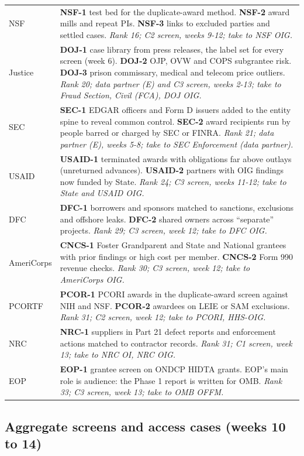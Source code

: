 \documentclass[letterpaper,11pt]{article}
\begin{document}
\begin{longtable}[l]{@{}l>{\raggedright\arraybackslash}p{}@{}}
NSF & \textbf{NSF-1} test bed for the duplicate-award method. \textbf{NSF-2} award mills and repeat PIs. \textbf{NSF-3} links to excluded parties and settled cases. \emph{Rank 16; C2 screen, weeks 9-12; take to NSF OIG.} \\
Justice & \textbf{DOJ-1} case library from press releases, the label set for every screen (week 6). \textbf{DOJ-2} OJP, OVW and COPS subgrantee risk. \textbf{DOJ-3} prison commissary, medical and telecom price outliers. \emph{Rank 20; data partner (E) and C3 screen, weeks 2-13; take to Fraud Section, Civil (FCA), DOJ OIG.} \\
SEC & \textbf{SEC-1} EDGAR officers and Form D issuers added to the entity spine to reveal common control. \textbf{SEC-2} award recipients run by people barred or charged by SEC or FINRA. \emph{Rank 21; data partner (E), weeks 5-8; take to SEC Enforcement (data partner).} \\
USAID & \textbf{USAID-1} terminated awards with obligations far above outlays (unreturned advances). \textbf{USAID-2} partners with OIG findings now funded by State. \emph{Rank 24; C3 screen, weeks 11-12; take to State and USAID OIG.} \\
DFC & \textbf{DFC-1} borrowers and sponsors matched to sanctions, exclusions and offshore leaks. \textbf{DFC-2} shared owners across ``separate'' projects. \emph{Rank 29; C3 screen, week 12; take to DFC OIG.} \\
AmeriCorps & \textbf{CNCS-1} Foster Grandparent and State and National grantees with prior findings or high cost per member. \textbf{CNCS-2} Form 990 revenue checks. \emph{Rank 30; C3 screen, week 12; take to AmeriCorps OIG.} \\
PCORTF & \textbf{PCOR-1} PCORI awards in the duplicate-award screen against NIH and NSF. \textbf{PCOR-2} awardees on LEIE or SAM exclusions. \emph{Rank 31; C2 screen, week 12; take to PCORI, HHS-OIG.} \\
NRC & \textbf{NRC-1} suppliers in Part 21 defect reports and enforcement actions matched to contractor records. \emph{Rank 31; C1 screen, week 13; take to NRC OI, NRC OIG.} \\
EOP & \textbf{EOP-1} grantee screen on ONDCP HIDTA grants. EOP's main role is audience: the Phase 1 report is written for OMB. \emph{Rank 33; C3 screen, week 13; take to OMB OFFM.} \\
\end{longtable}\endgroup

\hypertarget{aggregate-screens-and-access-cases-weeks-10-to-14}{%
\subsection{Aggregate screens and access cases (weeks 10 to
14)}\label{aggregate-screens-and-access-cases-weeks-10-to-14}}
\end{document}
